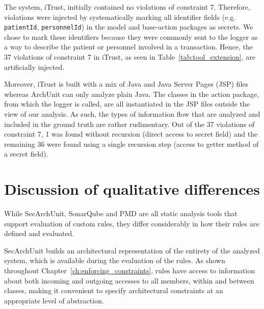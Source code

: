 The system, iTrust, initially contained no violations of constraint 7. Therefore, violations were injected by systematically marking all identifier fields (e.g. \texttt{patientId}, \texttt{personnelId}) in the model and base-action packages as secrets. We chose to mark these identifiers because they were commonly sent to the logger as a way to describe the patient or personnel involved in a transaction. Hence, the 37 violations of constraint 7 in iTrust, as seen in Table~\ref{tab:tool_extension}, are artificially injected.

Moreover, iTrust is built with a mix of Java and Java Server Pages (JSP) files whereas ArchUnit can only analyze plain Java. The classes in the action package, from which the logger is called, are all instantiated in the JSP files outside the view of our analysis. As such, the types of information flow that are analyzed and included in the ground truth are rather rudimentary. Out of the 37 violations of constraint 7, 1 was found without recursion (direct access to secret field) and the remaining 36 were found using a single recursion step (access to getter method of a secret field).




\section{Discussion of qualitative differences}
While SecArchUnit, SonarQube and PMD are all static analysis tools that support evaluation of custom rules, they differ considerably in how their rules are defined and evaluated.

SecArchUnit builds an architectural representation of the entirety of the analyzed system, which is available during the evaluation of the rules. As shown throughout Chapter~\ref{ch:enforcing_constraints}, rules have access to information about both incoming and outgoing accesses to all members, within and between classes, making it convenient to specify architectural constraints at an appropriate level of abstraction.

